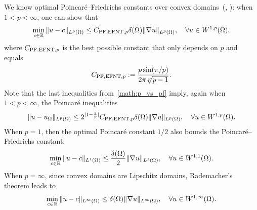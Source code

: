 \documentclass[10pt,a4paper]{article}
\begin{document}
We know optimal Poincar\'e--Friedrichs constants over convex domains~(\cite[Theorem~1.1]{ferone2012remark}, \cite[Theorem~1.1]{esposito2013poincare}): 
when $1 < p < \infty$, one can show that 
\begin{align}\label{math:esposito:pf}
    \min\limits_{ c \in {\mathbb R} }
    \| u - c \|_{L^{p}(\Omega)}
    \leq 
    C_{{\rm PF},{\rm EFNT},p}
    {\delta}(\Omega)
    \| \nabla u \|_{L^{p}(\Omega)}
    ,
    \quad 
    \forall 
    u \in W^{1,p}(\Omega)
    ,
\end{align}
where $C_{{\rm PF},{\rm EFNT},p}$ is the best possible constant that only depends on $p$ and equals 
\begin{align*}
    C_{{\rm PF},{\rm EFNT},p}
    :=
    \frac{ p \sin(\pi/p) }{ 2\pi \sqrt[p]{p-1} }
    .
\end{align*}
Note that the last inequalities from~\eqref{math:p_vs_pf} imply, again when $1 < p < \infty$, the Poincar\'e inequalities
\begin{align}\label{math:esposito:poincare}
    \| u - u_{\Omega} \|_{L^{p}(\Omega)}
    \leq 
    2^{|1-\frac 2 p|}C_{{\rm PF},{\rm EFNT},p}
    {\delta}(\Omega)
    \| \nabla u \|_{L^{p}(\Omega)}
    ,
    \quad 
    \forall 
    u \in W^{1,p}(\Omega)
    .
\end{align}
When $p=1$, then the optimal Poincar\'e constant $1/2$ also bounds the Poincar\'e--Friedrichs constant:
\begin{align}\label{math:l1estimate}
    \min\limits_{ c \in {\mathbb R} }
    \| u - c \|_{L^{1}(\Omega)}
    \leq 
    \frac{ {\delta}(\Omega) }{2}
    \| \nabla u \|_{L^{1}(\Omega)}
    ,
    \quad 
    \forall 
    u \in W^{1,1}(\Omega)
    .
\end{align}
When $p=\infty$, since convex domains are Lipschitz domains, Rademacher's theorem leads to 
\begin{align}\label{math:lipschitzestimate}
    \min\limits_{ c \in {\mathbb R} }
    \| u - c \|_{L^{\infty}(\Omega)}
    \leq 
    {\delta}(\Omega)
    \| \nabla u \|_{L^{\infty}(\Omega)}
    ,
    \quad 
    \forall 
    u \in W^{1,\infty}(\Omega)
    .
\end{align}


\end{document}
